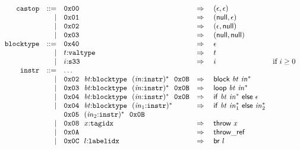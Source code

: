 $$
\begin{array}[t]{@{}lrrl@{}l@{}l@{}l@{}}
& {\mathtt{castop}} & ::= & \mathtt{0x00} & \quad\Rightarrow\quad{} & (\epsilon, \epsilon) \\
& & | & \mathtt{0x01} & \quad\Rightarrow\quad{} & (\mathsf{null}, \epsilon) \\
& & | & \mathtt{0x02} & \quad\Rightarrow\quad{} & (\epsilon, \mathsf{null}) \\
& & | & \mathtt{0x03} & \quad\Rightarrow\quad{} & (\mathsf{null}, \mathsf{null}) \\
& {\mathtt{blocktype}} & ::= & \mathtt{0x40} & \quad\Rightarrow\quad{} & \epsilon \\
& & | & t{:}{\mathtt{valtype}} & \quad\Rightarrow\quad{} & t \\
& & | & i{:}{\mathtt{s33}} & \quad\Rightarrow\quad{} & i & \quad \mbox{if}~ i \geq 0 \\
& {\mathtt{instr}} & ::= & \dots \\
& & | & \mathtt{0x02}~~{\mathit{bt}}{:}{\mathtt{blocktype}}~~{({\mathit{in}}{:}{\mathtt{instr}})^\ast}~~\mathtt{0x0B} & \quad\Rightarrow\quad{} & \mathsf{block}~{\mathit{bt}}~{{\mathit{in}}^\ast} \\
& & | & \mathtt{0x03}~~{\mathit{bt}}{:}{\mathtt{blocktype}}~~{({\mathit{in}}{:}{\mathtt{instr}})^\ast}~~\mathtt{0x0B} & \quad\Rightarrow\quad{} & \mathsf{loop}~{\mathit{bt}}~{{\mathit{in}}^\ast} \\
& & | & \mathtt{0x04}~~{\mathit{bt}}{:}{\mathtt{blocktype}}~~{({\mathit{in}}{:}{\mathtt{instr}})^\ast}~~\mathtt{0x0B} & \quad\Rightarrow\quad{} & \mathsf{if}~{\mathit{bt}}~{{\mathit{in}}^\ast}~\mathsf{else}~\epsilon \\
& & | & \begin{array}[t]{@{}l@{}} \mathtt{0x04}~~{\mathit{bt}}{:}{\mathtt{blocktype}}~~{({\mathit{in}}_1{:}{\mathtt{instr}})^\ast} \\
  \mathtt{0x05}~~{({\mathit{in}}_2{:}{\mathtt{instr}})^\ast}~~\mathtt{0x0B} \end{array} & \quad\Rightarrow\quad{} & \mathsf{if}~{\mathit{bt}}~{{\mathit{in}}_1^\ast}~\mathsf{else}~{{\mathit{in}}_2^\ast} \\
& & | & \mathtt{0x08}~~x{:}{\mathtt{tagidx}} & \quad\Rightarrow\quad{} & \mathsf{throw}~x \\
& & | & \mathtt{0x0A} & \quad\Rightarrow\quad{} & \mathsf{throw\_ref} \\
& & | & \mathtt{0x0C}~~l{:}{\mathtt{labelidx}} & \quad\Rightarrow\quad{} & \mathsf{br}~l \\

\end{array}$$

